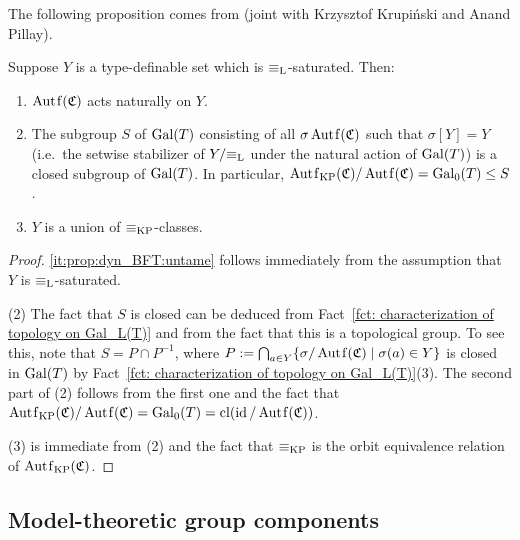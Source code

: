 	The following proposition comes from \cite{KPR15} (joint with Krzysztof Krupiński and Anand Pillay).
	\begin{prop}\label{prop:lem_closed}
		Suppose $Y$ is a type-definable set which is $\equiv_{\mathrm{L}}$-saturated. Then:
		\begin{enumerate}
			\item
			$\Autf(\fC)$ acts naturally on $Y$.
			\item
			The subgroup $S$ of $\operatorname{{Gal}}(T)$ consisting of all $\sigma\Autf(\fC)$ such that $\sigma[Y]=Y$ (i.e.\ the setwise stabilizer of $Y/{\equiv_{\mathrm{L}}}$ under the natural action of $\operatorname{{Gal}}(T)$) is a closed subgroup of $\operatorname{{Gal}}(T)$. In particular, $\Autf_\KP(\fC)/\Autf(\fC) =\Gal_0(T) \leq S$.
			\item
			$Y$ is a union of $\equiv_{\mathrm{KP}}$-classes.
		\end{enumerate}
	\end{prop}
	\begin{proof}
		\ref{it:prop:dyn_BFT:untame} follows immediately from the assumption that $Y$ is $\equiv_{\mathrm{L}}$-saturated.
		
			(2) The fact that $S$ is closed can be deduced from Fact~\ref{fct: characterization of topology on Gal_L(T)} and from the fact that this is a topological group. To see this, note that $S=P \cap P^{-1}$, where $P:= \bigcap_{a \in Y} \{ \sigma/\Autf(\fC)\mid \sigma(a) \in Y\}$ is closed in $\operatorname{{Gal}}(T)$ by Fact~\ref{fct: characterization of topology on Gal_L(T)}(3). The second part of (2) follows from the first one and the fact that $\Autf_\KP(\fC)/\Autf(\fC) = \Gal_0(T)=\cl (\id/\Autf(\fC))$.
		
		(3) is immediate from (2) and the fact that $\equiv_{\mathrm{KP}}$ is the orbit equivalence relation of $\Autf_\KP(\fC)$.
	\end{proof}
	
	\subsection*{Model-theoretic group components}
	
